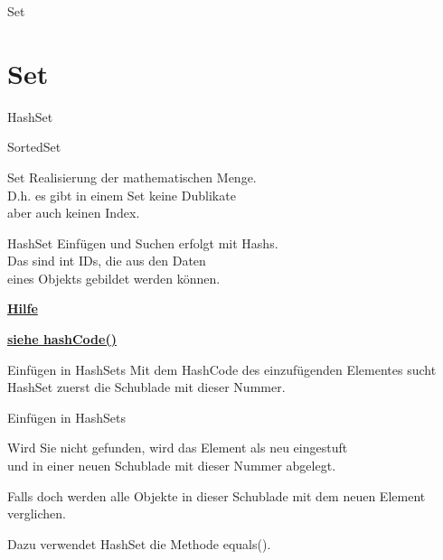 \documentclass[10pt]{beamer}
\begin{document}
\begin{frame}[fragile]{Set}
    \section{Set}
HashSet

SortedSet
\end{frame}

\begin{frame}[fragile]{Set}
Realisierung der mathematischen Menge.\\
D.h. es gibt in einem Set keine Dublikate\\
aber auch keinen Index.
\end{frame}

\begin{frame}[fragile]{HashSet}
Einfügen und Suchen erfolgt mit Hashs.\\
Das sind int IDs, die aus den Daten\\
eines Objekts gebildet werden können.

\textcolor{mymauve}{\textbf{\href{http://www.straub.as/java/basic/hashset.html}{Hilfe}}}

\textcolor{mymauve}{\textbf{\href{https://www.baeldung.com/java-hashcode}{siehe hashCode()}}}
\end{frame}

\begin{frame}[fragile]{Einfügen in HashSets}
Mit dem \textcolor{mygreen}{HashCode} des einzufügenden Elementes sucht HashSet zuerst die Schublade mit dieser Nummer.
\end{frame}

\begin{frame}[fragile]{Einfügen in HashSets}

Wird Sie nicht gefunden, wird das Element als neu eingestuft\\ 
und in einer neuen Schublade mit dieser Nummer abgelegt. 

Falls doch werden alle Objekte in dieser Schublade mit dem neuen Element verglichen.
 
Dazu verwendet \textcolor{mygreen}{HashSet} die Methode \textcolor{mygreen}{equals()}. 
\end{frame}
\end{document}

